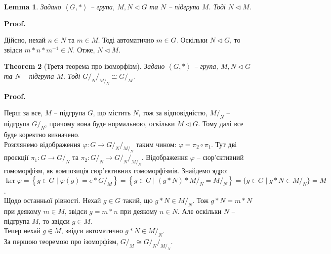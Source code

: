 \documentclass[a4paper, 10pt]{article}
\makeatletter
\theoremstyle{theoremdd}
\newtheorem{theorem}{Theorem}[subsection]
\theoremstyle{theoremdd}
\theoremstyle{theoremdd}
\theoremstyle{theoremdd}
\theoremstyle{theoremdd}
\theoremstyle{theoremdd}
\theoremstyle{theoremdd}
\theoremstyle{theoremdd}
\theoremstyle{theoremdd}
\theoremstyle{theoremdd}
\theoremstyle{theoremdd}
\theoremstyle{theoremdd}
\theoremstyle{theoremdd}
\newtheorem{lemma}[theorem]{Lemma}
\theoremstyle{theoremdd}
\theoremstyle{theoremdd}
\renewenvironment{proof}[1][Proof.\\]{\par
\pushQED{\hfill \qed}%
\normalfont \topsep6\p@\@plus6\p@\relax
\trivlist
\item\relax
{\bfseries
#1\@addpunct{.}}\hspace\labelsep\ignorespaces
}{%
\popQED\endtrivlist\@endpefalse
}
\makeatother
\begin{document}
\begin{lemma}
Задано $\left< G, *\right>$ -- група, $M,N \triangleleft G$ та $N$ -- підгрупа $M$. Тоді $N \triangleleft M$.
\end{lemma}

\begin{proof}
Дійсно, нехай $n \in N$ та $m \in M$. Тоді автоматично $m \in G$. Оскільки $N \triangleleft G$, то звідси $m*n*m^{-1} \in N$. Отже, $N \triangleleft M$.
\end{proof}

\begin{theorem}[Третя теорема про ізоморфізм]
Задано $\left< G, *\right>$ -- група, $M,N \triangleleft G$ та $N$ -- підгрупа $M$. Тоді ${G/_N}/_{M/_N} \cong G/_M$.
\end{theorem}

\begin{proof}
Перш за все, $M$ -- підгрупа $G$, що містить $N$, тож за відповідністю, $M/_N$ -- підгрупа $G/_N$, причому вона буде нормальною, оскільки $M \triangleleft G$. Тому далі все буде коректно визначено.\\
Розглянемо відображення $\varphi \colon G \to {G/_N}/_{M/_N}$ таким чином: $\varphi = \pi_2 \circ \pi_1$. Тут дві проєкції $\pi_1 \colon G \to G/_N$ та $\pi_2 \colon G/_N \to {G/_N}/_{M/_N}$. Відображення $\varphi$ -- сюр'єктивний гомоморфізм, як композиція сюр'єктивних гомоморфізмів. Знайдемо ядро:\\
$\ker \varphi = \left\{g \in G \mid \varphi(g) = e*G/_M \right\} = \left\{ g \in G \mid (g*N)*M/_N = M/_N \right\} = \{g \in G \mid g*N \in M/_N\} = M$.\\
Щодо останньої рівності. Нехай $g \in G$ такий, що $g*N \in M/_N$. Тож $g*N = m*N$ при деякому $m \in M$, звідси $g = m*n$ при деякому $n \in N$. Але оскільки $N$ -- підгрупа $M$, то звідси $g \in M$.\\
Тепер нехай $g \in M$, звідси автоматично $g*N \in M/_N$.\\
За першою теоремою про ізоморфізм, $G/_M \cong {G/_N}/_{M/_N}$.
\end{proof}
\end{document}

